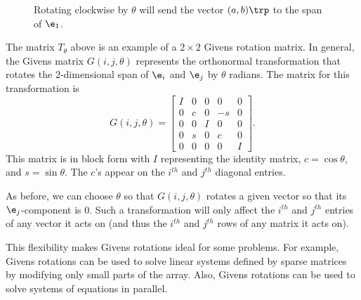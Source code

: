 \begin{figure}[H]
\begin{center}
\caption{Rotating clockwise by $\theta$ will send the vector $(a,b)\trp$ to the span of $\e_1$.}
\label{fig:angle}
\end{center}
\end{figure}

The matrix $T_{\theta}$ above is an example of a $2 \times 2$ Givens rotation matrix.
In general, the Givens matrix $G(i,j,\theta)$ represents the orthonormal transformation that rotates the 2-dimensional span of $\e_i$ and $\e_j$ by $\theta$ radians.
The matrix for this transformation is
\begin{equation*}
G(i,j,\theta) =
\left[\begin{array}{ccccc}
I & 0 & 0 & 0 & 0 \\
0 & c & 0 & -s & 0 \\
0 & 0 & I & 0 & 0 \\
0 & s & 0 & c & 0 \\
0 & 0 & 0 & 0 & I
\end{array}\right].
\end{equation*}
This matrix is in block form with $I$ representing the identity matrix, $c=\cos \theta$, and $s=\sin \theta$.
The $c$'s appear on the $i^{th}$ and $j^{th}$ diagonal entries.

As before, we can choose $\theta$ so that $G(i,j,\theta)$ rotates a given vector so that its $\e_j$-component is 0.
Such a transformation will only affect the $i^{th}$ and $j^{th}$ entries of any vector it acts on (and thus the $i^{th}$ and $j^{th}$ rows of any matrix it acts on).

This flexibility makes Givens rotations ideal for some problems.
For example, Givens rotations can be used to solve linear systems defined by sparse matrices by modifying only small parts of the array.
Also, Givens rotations can be used to solve systems of equations in parallel.

